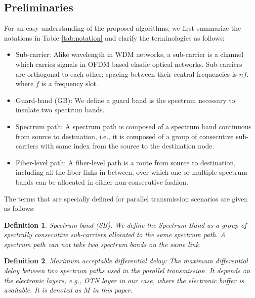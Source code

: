 \documentclass[conference]{IEEEtran}
\newtheorem{definition}{Definition}
\begin{document}
\subsection{Preliminaries}
For an easy understanding of the proposed algorithms, we first summarize the notations in Table \ref{tab:notation} and clarify the terminologies as follows:
\begin{itemize}
\item Sub-carrier:  Alike wavelength in WDM networks, a sub-carrier is a channel  which carries signals in OFDM based elastic optical networks. Sub-carriers are orthogonal to each other; spacing between their central frequencies is $nf$, where $f$ is a frequency slot.
\cite{Shieh:book}
\item Guard-band (GB): We define a guard band is the spectrum necessary to insulate two spectrum bands.
\item Spectrum path:  A spectrum path is composed of a spectrum band continuous from source to destination, i.e., it is composed of a group of consecutive sub-carriers with same index from the source to the destination node.
\item Fiber-level path: A fiber-level path is a route from source to destination, including all the fiber links in between, over which one or multiple spectrum bands can be allocated in either non-consecutive fashion. 
\end{itemize}
The terms that are specially defined for parallel transmission scenarios are given as follows:
\begin{definition}
\emph{Spectrum band (SB):} We define the \emph{Spectrum Band}  as a group of  spectrally consecutive sub-carriers allocated to the same spectrum path. 
A spectrum path can not take two spectrum bands on the same link.
\end{definition}
\begin{definition}
\emph{Maximum acceptable differential delay:} The maximum differential delay between two spectrum paths used in the parallel transmission. It depends on the  electronic layers, e.g., OTN layer in our case, where the electronic buffer is available. It is denoted as $M$ in this paper. 
 \end{definition}
  
\end{document}
